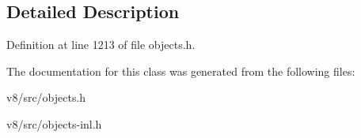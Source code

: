 \subsection{Detailed Description}


Definition at line 1213 of file objects.\+h.



The documentation for this class was generated from the following files\+:\begin{DoxyCompactItemize}
\item 
v8/src/objects.\+h\item 
v8/src/objects-\/inl.\+h\end{DoxyCompactItemize}
